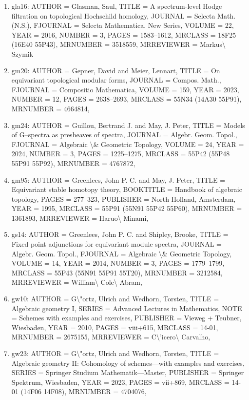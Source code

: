 \documentclass[11pt]{article}
\begin{document}
\begin{enumerate}[leftmargin=*]
  \item gla16: AUTHOR = Glasman, Saul, TITLE = A spectrum-level Hodge filtration on topological Hochschild homology, JOURNAL = Selecta Math. (N.S.), FJOURNAL = Selecta Mathematica. New Series, VOLUME = 22, YEAR = 2016, NUMBER = 3, PAGES = 1583--1612, MRCLASS = 18F25 (16E40 55P43), MRNUMBER = 3518559, MRREVIEWER = Markus\textbackslash{} Szymik
  \item gm20: AUTHOR = Gepner, David and Meier, Lennart, TITLE = On equivariant topological modular forms, JOURNAL = Compos. Math., FJOURNAL = Compositio Mathematica, VOLUME = 159, YEAR = 2023, NUMBER = 12, PAGES = 2638--2693, MRCLASS = 55N34 (14A30 55P91), MRNUMBER = 4664814,
  \item gm24: AUTHOR = Guillou, Bertrand J. and May, J. Peter, TITLE = Models of G--spectra as presheaves of spectra, JOURNAL = Algebr. Geom. Topol., FJOURNAL = Algebraic \textbackslash{}\& Geometric Topology, VOLUME = 24, YEAR = 2024, NUMBER = 3, PAGES = 1225--1275, MRCLASS = 55P42 (55P48 55P91 55P92), MRNUMBER = 4767872,
  \item gm95: AUTHOR = Greenlees, John P. C. and May, J. Peter, TITLE = Equivariant stable homotopy theory, BOOKTITLE = Handbook of algebraic topology, PAGES = 277--323, PUBLISHER = North-Holland, Amsterdam, YEAR = 1995, MRCLASS = 55P91 (55N91 55P42 55P60), MRNUMBER = 1361893, MRREVIEWER = Haruo\textbackslash{} Minami,
  \item gs14: AUTHOR = Greenlees, John P. C. and Shipley, Brooke, TITLE = Fixed point adjunctions for equivariant module spectra, JOURNAL = Algebr. Geom. Topol., FJOURNAL = Algebraic \textbackslash{}\& Geometric Topology, VOLUME = 14, YEAR = 2014, NUMBER = 3, PAGES = 1779--1799, MRCLASS = 55P43 (55N91 55P91 55T20), MRNUMBER = 3212584, MRREVIEWER = William\textbackslash{} Cole\textbackslash{} Abram,
  \item gw10: AUTHOR = G\textbackslash{}"ortz, Ulrich and Wedhorn, Torsten, TITLE = Algebraic geometry I, SERIES = Advanced Lectures in Mathematics, NOTE = Schemes with examples and exercises, PUBLISHER = Vieweg + Teubner, Wiesbaden, YEAR = 2010, PAGES = viii+615, MRCLASS = 14-01, MRNUMBER = 2675155, MRREVIEWER = C\textbackslash{}'icero\textbackslash{} Carvalho,
  \item gw23: AUTHOR = G\textbackslash{}"ortz, Ulrich and Wedhorn, Torsten, TITLE = Algebraic geometry II: Cohomology of schemes---with examples and exercises, SERIES = Springer Studium Mathematik---Master, PUBLISHER = Springer Spektrum, Wiesbaden, YEAR = 2023, PAGES = vii+869, MRCLASS = 14-01 (14F06 14F08), MRNUMBER = 4704076,

\end{enumerate}
\end{document}
